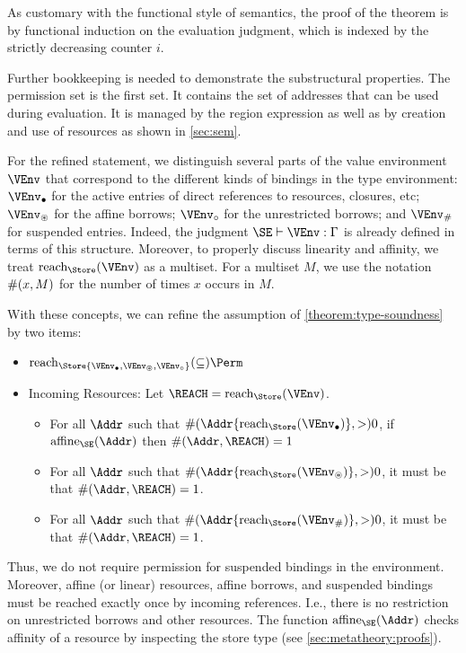 As customary with the functional style of semantics, the proof of the
theorem is by functional induction on the evaluation judgment, which
is indexed by the strictly decreasing counter $i$.

Further bookkeeping is needed to demonstrate the substructural
properties. The permission set is the first set. It contains the set
of addresses that can be used during evaluation. It is managed by the
region expression as well as by creation and use of resources as
shown in \cref{sec:sem}.

For the refined statement, we distinguish several parts of the value
environment $\VEnv$ that correspond to the different kinds of bindings in the
type environment: $\Active\VEnv$ for the active entries of direct
references to resources, closures, etc; $\MutableBorrows\VEnv$ for the
affine borrows; $\ImmutableBorrows\VEnv$ for the unrestricted borrows;
and $\Suspended\VEnv$ for suspended entries. Indeed, the judgment
$\SE \vdash \VEnv:\E$ is already defined in terms of this structure.
Moreover, to properly discuss linearity and affinity, we treat
$\Reach\Store\VEnv$ as a multiset. For a multiset
$M$, we use the notation $\#(x,M)$ for the number of times $x$ occurs in $M$.


With these concepts, we can refine the assumption of
\cref{theorem:type-soundness} by two items:
\begin{itemize}
\item $\Reach\Store{\Active\VEnv, \MutableBorrows\VEnv, \ImmutableBorrows\VEnv} \subseteq \Perm$
\item Incoming Resources: Let $\REACH = \Reach\Store\VEnv$.
  \begin{itemize}
  \item 
    For all $\Addr$ such that $\MultiNumber\Addr{\Reach{\Store}{\Active\VEnv}} >0$,
    if $\Affine{\SE}\Addr$ then $\MultiNumber\Addr\REACH= 1$
  \item For all $\Addr$ such that $
    \MultiNumber\Addr{\Reach{\Store}{\MutableBorrows\VEnv}} >0$, it
    must be that $\MultiNumber\Addr\REACH=1$.
  \item For all $\Addr$ such that $
    \MultiNumber\Addr{\Reach{\Store}{\Suspended\VEnv}} >0$, it
    must be that $\MultiNumber\Addr\REACH=1$.
  \end{itemize}
\end{itemize}
Thus, we do not require permission for suspended bindings in the
environment. Moreover, affine (or linear)  resources, affine
borrows, and suspended bindings must be reached exactly once by
incoming references. I.e., there is no restriction on unrestricted
borrows and other resources. The function $\Affine{\SE}\Addr$ checks
affinity of a resource by inspecting the store type (see
\cref{sec:metatheory:proofs}). 

